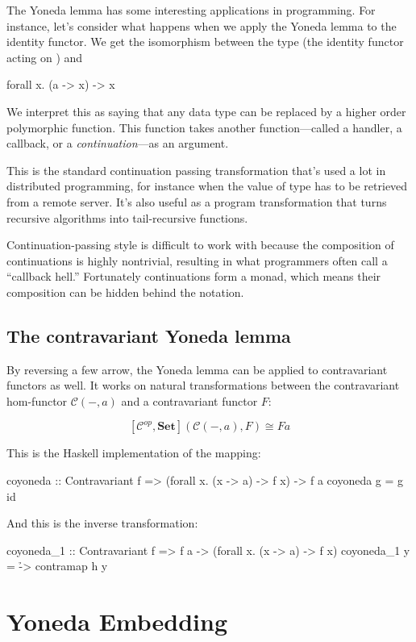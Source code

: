 \documentclass[DaoFP]{subfiles}
\begin{document}
The Yoneda lemma has some interesting applications in programming. For instance, let's consider what happens when we apply the Yoneda lemma to the identity functor. We get the isomorphism between the type  (the identity functor acting on ) and
\begin{haskell}
forall x. (a -> x) -> x
\end{haskell}
We interpret this as saying that any data type  can be replaced by a higher order polymorphic function. This function takes another function---called a handler, a callback, or a \emph{continuation}---as an argument. 

This is the standard continuation passing transformation that's used a lot in distributed programming, for instance when the value of type  has to be retrieved from a remote server. It's also useful as a program transformation that turns recursive algorithms into tail-recursive functions.

Continuation-passing style is difficult to work with because the composition of continuations is highly nontrivial, resulting in what programmers often call a ``callback hell.'' Fortunately continuations form a monad, which means their composition can be hidden behind the  notation.

\subsection{The contravariant Yoneda lemma}

By reversing a few arrow, the Yoneda lemma can be applied to contravariant functors as well. It works on natural transformations between the contravariant hom-functor $\mathcal{C}(-, a)$ and a contravariant functor $F$:

\[ [\mathcal{C}^{op}, \mathbf{Set}]( \mathcal{C}(-, a), F) \cong F a \]

This is the Haskell implementation of the mapping:
\begin{haskell}
coyoneda :: Contravariant f => (forall x. (x -> a) -> f x) -> f a
coyoneda g = g id
\end{haskell}
And this is the inverse transformation:
\begin{haskell}
coyoneda_1 :: Contravariant f => f a -> (forall x. (x -> a) -> f x)
coyoneda_1 y = \h -> contramap h y
\end{haskell}

\section{Yoneda Embedding}
\end{document}
